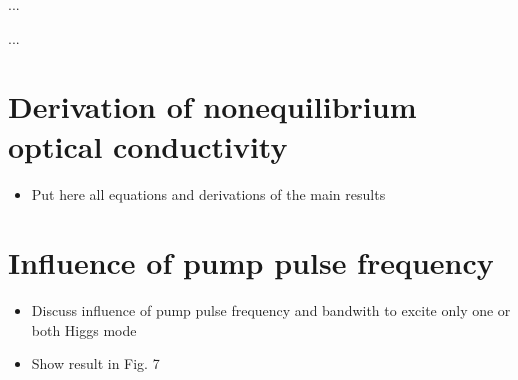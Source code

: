 \documentclass[aps,prb,reprint,noeprint,superscriptaddress]{revtex4-1}
\begin{document}
...







\begin{acknowledgments}
...
\end{acknowledgments}











\appendix


\section{Derivation of nonequilibrium optical conductivity}
\label{sec:derivation_noneq_cond}


\begin{itemize}
	\item Put here all equations and derivations of the main results
\end{itemize}






\section{Influence of pump pulse frequency}
\label{sec:influence_pump_pulse_freq}

\begin{itemize}
	\item Discuss influence of pump pulse frequency and bandwith to excite only one or both Higgs mode
	\item Show result in Fig. 7
\end{itemize}
\end{document}
